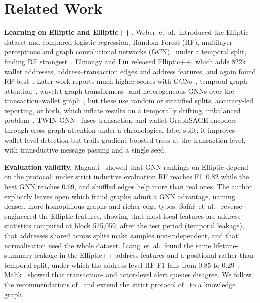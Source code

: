 \section{Related Work}\label{sec:related}

\textbf{Learning on Elliptic and Elliptic++.}
Weber~et~al.\ introduced the Elliptic dataset and compared logistic
regression, Random Forest (RF), multilayer perceptrons and graph convolutional
networks (GCN)~\cite{kipf2017} under a temporal split, finding RF
strongest~\cite{weber2019}. Elmougy and Liu released Elliptic++, which adds
822k wallet addresses, address--transaction edges and address features, and
again found RF best~\cite{elmougy2023}. Later work reports much higher scores
with GCNs~\cite{asiri2025}, temporal graph attention~\cite{zheng2025}, wavelet
graph transformers~\cite{lin2026} and heterogeneous GNNs over the
transaction--wallet graph~\cite{ferretti2024,perezcano2025}, but these use
random or stratified splits, accuracy-led reporting, or both, which inflate
results on a temporally drifting, imbalanced problem~\cite{he2009}.
TWIN-GNN~\cite{ichull2026twin} fuses transaction and wallet GraphSAGE
encoders through cross-graph attention under a chronological label split; it
improves wallet-level detection but trails gradient-boosted trees at the
transaction level, with transductive message passing and a single seed.

\textbf{Evaluation validity.}
Maganti~\cite{maganti2026} showed that GNN rankings on Elliptic depend on the
protocol: under strict inductive evaluation RF reaches F1~0.82 while the best
GNN reaches 0.69, and shuffled edges help more than real ones. The author
explicitly leaves open which fraud graphs admit a GNN advantage, naming denser,
more homophilous graphs and richer edge types. {\v S}af{\'a}{\v r}~et~al.~\cite{safar2026}
reverse-engineered the Elliptic features, showing that most local features are
address statistics computed at block 575{,}059, after the test period
(temporal leakage), that addresses shared across splits make samples
non-independent, and that normalisation used the whole dataset. Liang~et~al.\
found the same lifetime-summary leakage in the Elliptic++ address features
and a positional rather than temporal split, under which the address-level RF
F1 falls from 0.85 to 0.29~\cite{liang2026}. Malik~\cite{malik2026} showed that
transaction- and actor-level alert queues disagree. We follow the
recommendations of~\cite{safar2026} and extend the strict protocol
of~\cite{maganti2026} to a knowledge graph.

